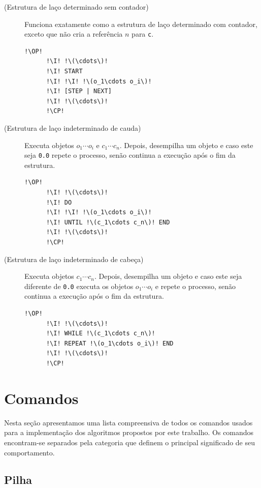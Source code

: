 \documentclass[12pt,a4paper]{report}
\newcommand{\kwd}[1]{\texttt{\textcolor{keyword}{#1}}}
\newcommand{\I}{\enspace\textcolor{indent}\vrule\hspace{2pt}}
\newcommand{\OP}{\kwd{$\ll$}}   %
\newcommand{\CP}{\kwd{$\gg$}}   %
\numberwithin{theorem}{chapter}
\begin{document}
\begin{description}
  \item[(Estrutura de laço determinado sem contador)] Funciona
    exatamente como a estrutura de laço determinado com contador,
    exceto que não cria a referência \(n\) para \texttt{c}.
    \begin{lstlisting}[language=userrpl,numbers=none]
      !\OP!
      !\I! !\(\cdots\)!
      !\I! START
      !\I! !\I! !\(o_1\cdots o_i\)!
      !\I! [STEP | NEXT]
      !\I! !\(\cdots\)!
      !\CP!
    \end{lstlisting}

  \item[(Estrutura de laço indeterminado de cauda)] Executa objetos
    \(o_1\cdots o_i\) e \(c_1\cdots c_n\).  Depois, desempilha um
    objeto e caso este seja \texttt{0.0} repete o processo, senão
    continua a execução após o fim da estrutura.
    \begin{lstlisting}[language=userrpl,numbers=none]
      !\OP!
      !\I! !\(\cdots\)!
      !\I! DO
      !\I! !\I! !\(o_1\cdots o_i\)!
      !\I! UNTIL !\(c_1\cdots c_n\)! END
      !\I! !\(\cdots\)!
      !\CP!
    \end{lstlisting}

  \item[(Estrutura de laço indeterminado de cabeça)] Executa objetos
    \(c_1\cdots c_n\).  Depois, desempilha um objeto e caso este seja
    diferente de \texttt{0.0} executa os objetos \(o_1\cdots o_i\) e
    repete o processo, senão continua a execução após o fim da
    estrutura.
    \begin{lstlisting}[language=userrpl,numbers=none]
      !\OP!
      !\I! !\(\cdots\)!
      !\I! WHILE !\(c_1\cdots c_n\)!
      !\I! REPEAT !\(o_1\cdots o_i\)! END
      !\I! !\(\cdots\)!
      !\CP!
    \end{lstlisting}

\end{description}



\section{Comandos}\label{Comandos}

Nesta seção apresentamos uma lista compreensiva de todos os comandos
usados para a implementação dos algoritmos propostos por este
trabalho.  Os comandos encontram-se separados pela categoria que
definem o principal significado de seu comportamento.

\subsection{Pilha}
\end{document}
